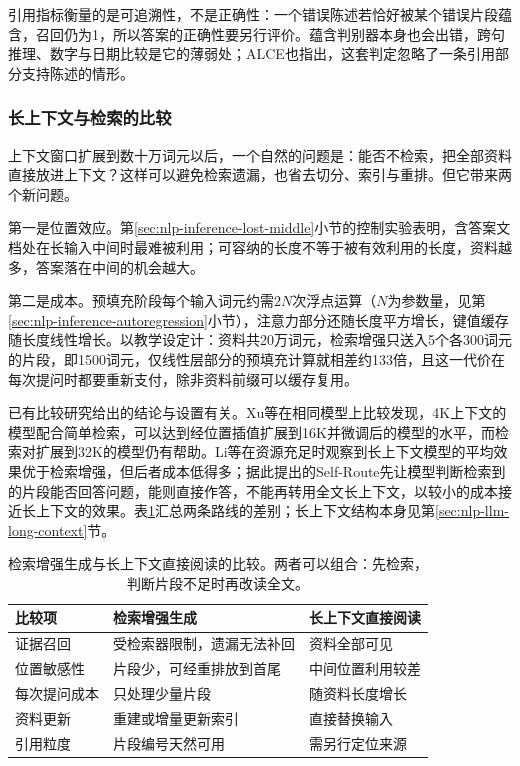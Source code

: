 引用指标衡量的是可追溯性，不是正确性：一个错误陈述若恰好被某个错误片段蕴含，召回仍为1，所以答案的正确性要另行评价。蕴含判别器本身也会出错，跨句推理、数字与日期比较是它的薄弱处；ALCE也指出，这套判定忽略了一条引用部分支持陈述的情形。

\subsubsection{长上下文与检索的比较}
\label{sec:nlp-dialogue-long-context}

上下文窗口扩展到数十万词元以后，一个自然的问题是：能否不检索，把全部资料直接放进上下文？这样可以避免检索遗漏，也省去切分、索引与重排。但它带来两个新问题。

第一是位置效应。第\ref{sec:nlp-inference-lost-middle}小节的控制实验表明，含答案文档处在长输入中间时最难被利用\cite{liu2024middle}；可容纳的长度不等于被有效利用的长度，资料越多，答案落在中间的机会越大。

第二是成本。预填充阶段每个输入词元约需$2N$次浮点运算（$N$为参数量，见第\ref{sec:nlp-inference-autoregression}小节），注意力部分还随长度平方增长，键值缓存随长度线性增长。以教学设定计：资料共20万词元，检索增强只送入5个各300词元的片段，即1500词元，仅线性层部分的预填充计算就相差约133倍，且这一代价在每次提问时都要重新支付，除非资料前缀可以缓存复用。

已有比较研究给出的结论与设置有关。Xu等在相同模型上比较发现，4K上下文的模型配合简单检索，可以达到经位置插值扩展到16K并微调后的模型的水平，而检索对扩展到32K的模型仍有帮助。Li等在资源充足时观察到长上下文模型的平均效果优于检索增强，但后者成本低得多；据此提出的Self-Route先让模型判断检索到的片段能否回答问题，能则直接作答，不能再转用全文长上下文，以较小的成本接近长上下文的效果。表\ref{tab:nlp-dialogue-long-context}汇总两条路线的差别；长上下文结构本身见第\ref{sec:nlp-llm-long-context}节。

\begin{table}[htbp]
  \centering
  \small
  \begin{tabular}{@{}lll@{}}
    \toprule
    比较项 & 检索增强生成 & 长上下文直接阅读\\
    \midrule
    证据召回 & 受检索器限制，遗漏无法补回 & 资料全部可见\\
    位置敏感性 & 片段少，可经重排放到首尾 & 中间位置利用较差\\
    每次提问成本 & 只处理少量片段 & 随资料长度增长\\
    资料更新 & 重建或增量更新索引 & 直接替换输入\\
    引用粒度 & 片段编号天然可用 & 需另行定位来源\\
    \bottomrule
  \end{tabular}
  \caption{检索增强生成与长上下文直接阅读的比较。两者可以组合：先检索，判断片段不足时再改读全文。}
  \label{tab:nlp-dialogue-long-context}
\end{table}

